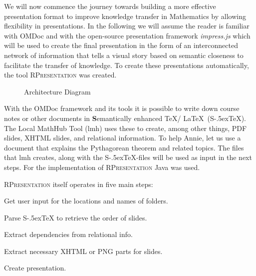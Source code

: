 \documentclass{llncs}
\def\stex{\texorpdfstring{\raisebox{-.5ex}S\kern-.5ex\TeX}{sTeX}\xspace}
\def\sTeX{\stex}
\newcommand{\sys}{\textsc{RPresentation}\xspace}
\begin{document}
We will now commence the journey towards building a more effective presentation format to improve knowledge transfer in Mathematics by allowing flexibility in presentations. In the following we will assume the reader is familiar with OMDoc \cite{Kohlhase:OMDoc1.2} and with the open-source presentation framework \textit{impress.js} \cite{JSImpress:npentrel14} which will be used to create the final presentation in the form of an interconnected network of information that tells a visual story based on semantic closeness to facilitate the transfer of knowledge. To create these presentations automatically, the tool \sys \cite{npentrel:npentrel15} was created. 

\begin{figure}\centering\vspace{-2em}
  \vspace{-1em}
  \caption{Architecture Diagram}\label{fig:architecture}\vspace{-1em}
\end{figure}

With the OMDoc framework and its tools it is possible to write down course notes or other documents in \textbf{S}emantically enhanced \TeX / \LaTeX\ (\stex). The Local MathHub Tool (lmh) uses these to create, among other things, PDF slides, XHTML slides, and relational information. To help Annie, let us use a document that explains the Pythagorean theorem and related topics. The files that lmh creates, along with the \stex -files will be used as input in the next steps. For the implementation of  \sys Java was used.

\sys itself operates in five main steps:
\begin{compactenum}
\item Get user input for the locations and names of folders.
\item Parse \sTeX to retrieve the order of slides.
\item Extract dependencies from relational info.
\item Extract necessary XHTML or PNG parts for slides.
\item Create presentation.
\end{compactenum}
\end{document}

